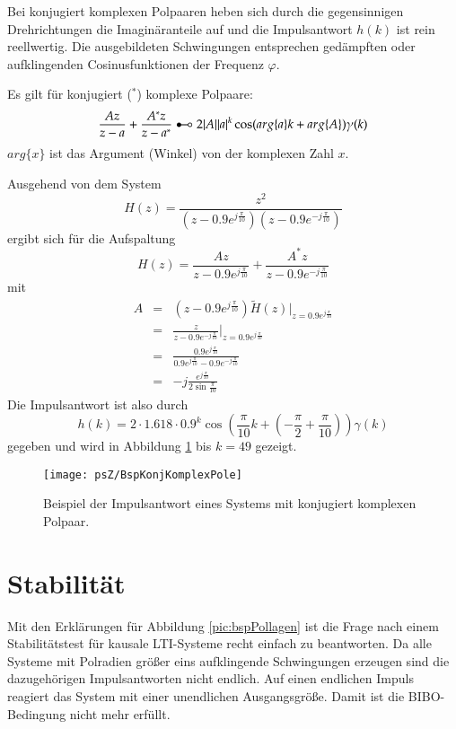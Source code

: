 Bei konjugiert komplexen Polpaaren heben sich durch die
gegensinnigen Drehrichtungen die Imaginäranteile auf und die
Impulsantwort $h(k)$ ist rein reellwertig. Die ausgebildeten
Schwingungen entsprechen gedämpften oder aufklingenden
Cosinusfunktionen der Frequenz $\varphi$.

Es gilt für
konjugiert ($^{\ast}$) komplexe Polpaare:
\begin{equation}
    \frac{Az}{z-a} + \frac{A^{\ast}z}{z-a^{\ast}} \RueckTrans 2|A||a|^k\cos(arg\{a\}k + arg\{A\})\gamma(k)
\end{equation}
$arg\{x\}$ ist das Argument (Winkel) von der komplexen Zahl $x$.

\begin{example}
Ausgehend von dem System
\[
    H(z) = \frac{z^2}{(z-0.9e^{j\frac{\pi}{10}})(z-0.9e^{-j\frac{\pi}{10}})}
\]
ergibt sich für die Aufspaltung
\[
    H(z) = \frac{Az}{z-0.9e^{j\frac{\pi}{10}}} + \frac{A^{\ast}z}{z-0.9e^{-j\frac{\pi}{10}}}
\]
mit
\begin{eqnarray}
    A &=& (z-0.9e^{j\frac{\pi}{10}})\widetilde{H}(z)\Bigg|_{z = 0.9e^{j\frac{\pi}{10}}}\\
    & = & \frac{z}{z-0.9e^{-j\frac{\pi}{10}}}\Bigg|_{z = 0.9e^{j\frac{\pi}{10}}}\\
    & = & \frac{0.9e^{j\frac{\pi}{10}}}{0.9e^{j\frac{\pi}{10}}-0.9e^{-j\frac{\pi}{10}}}\\
    & = & -j\frac{e^{j\frac{\pi}{10}}}{2\sin \frac{\pi}{10}}
\end{eqnarray}
Die Impulsantwort ist also durch
\[
    h(k) = 2\cdot 1.618 \cdot 0.9^k \cos\left(\frac{\pi}{10}k +\left(-\frac{\pi}{2} + \frac{\pi}{10}\right)\right)\gamma(k)
\]
gegeben und wird in Abbildung \ref{pic:BspKonjKomplexPol} bis $k = 49$ gezeigt.
\begin{figure}[H]
\begin{center}
\texttt{[image: psZ/BspKonjKomplexPole]}
\caption{\label{pic:BspKonjKomplexPol}Beispiel der Impulsantwort eines Systems mit
konjugiert komplexen Polpaar.}
\end{center}
\end{figure}
\hspace{0.1mm}
\end{example}

\section{Stabilität}
Mit den Erklärungen für Abbildung \ref{pic:bspPollagen} ist die
Frage nach einem Stabilitätstest für kausale LTI-Systeme recht einfach zu
beantworten. Da alle Systeme mit Polradien größer eins
aufklingende Schwingungen erzeugen sind die dazugehörigen
Impulsantworten nicht endlich. Auf einen endlichen Impuls reagiert
das System mit einer unendlichen Ausgangsgröße. Damit ist die
BIBO-Bedingung nicht mehr erfüllt.

